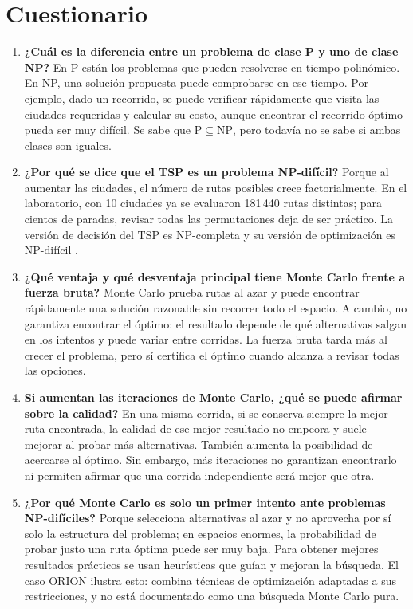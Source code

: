 \documentclass{article}
\begin{document}
\section{Cuestionario}
\begin{enumerate}
	\item \textbf{¿Cuál es la diferencia entre un problema de clase P y uno de clase NP?} En P están los problemas que pueden resolverse en tiempo polinómico. En NP, una solución propuesta puede comprobarse en ese tiempo. Por ejemplo, dado un recorrido, se puede verificar rápidamente que visita las ciudades requeridas y calcular su costo, aunque encontrar el recorrido óptimo pueda ser muy difícil. Se sabe que $\mathrm{P}\subseteq\mathrm{NP}$, pero todavía no se sabe si ambas clases son iguales.

    \item \textbf{¿Por qué se dice que el TSP es un problema NP-difícil?} Porque al aumentar las ciudades, el número de rutas posibles crece factorialmente. En el laboratorio, con 10 ciudades ya se evaluaron 181\,440 rutas distintas; para cientos de paradas, revisar todas las permutaciones deja de ser práctico. La versión de decisión del TSP es NP-completa y su versión de optimización es NP-difícil \parencite{garey1979}.

    \item \textbf{¿Qué ventaja y qué desventaja principal tiene Monte Carlo frente a fuerza bruta?} Monte Carlo prueba rutas al azar y puede encontrar rápidamente una solución razonable sin recorrer todo el espacio. A cambio, no garantiza encontrar el óptimo: el resultado depende de qué alternativas salgan en los intentos y puede variar entre corridas. La fuerza bruta tarda más al crecer el problema, pero sí certifica el óptimo cuando alcanza a revisar todas las opciones.

    \item \textbf{Si aumentan las iteraciones de Monte Carlo, ¿qué se puede afirmar sobre la calidad?} En una misma corrida, si se conserva siempre la mejor ruta encontrada, la calidad de ese mejor resultado no empeora y suele mejorar al probar más alternativas. También aumenta la posibilidad de acercarse al óptimo. Sin embargo, más iteraciones no garantizan encontrarlo ni permiten afirmar que una corrida independiente será mejor que otra.

    \item \textbf{¿Por qué Monte Carlo es solo un primer intento ante problemas NP-difíciles?} Porque selecciona alternativas al azar y no aprovecha por sí solo la estructura del problema; en espacios enormes, la probabilidad de probar justo una ruta óptima puede ser muy baja. Para obtener mejores resultados prácticos se usan heurísticas que guían y mejoran la búsqueda. El caso ORION ilustra esto: combina técnicas de optimización adaptadas a sus restricciones, y no está documentado como una búsqueda Monte Carlo pura.
\end{enumerate}
\end{document}
